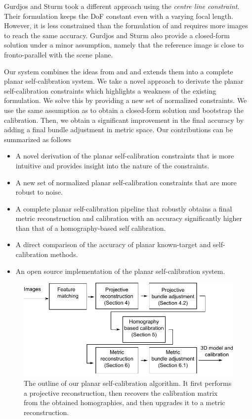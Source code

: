 \documentclass[10pt,twocolumn,letterpaper]{article}
\begin{document}
Gurdjos and Sturm \cite{gurdjos2003} took a different approach using the \emph{centre line constraint}. Their formulation keeps the DoF constant even with a varying focal length. However, it is less constrained than the formulation of \cite{bocquillon2006} and requires more images to reach the same accuracy. Gurdjos and Sturm also provide a closed-form solution under a minor assumption, namely that the reference image is close to fronto-parallel with the scene plane.

Our system combines the ideas from \cite{bocquillon2006} and \cite{gurdjos2003} and extends them into a complete planar self-calibration system. We take a novel approach to derivate the planar self-calibration constraints which highlights a weakness of the existing formulation. We solve this by providing a new set of normalized constraints. We use the same assumption as \cite{gurdjos2003} to obtain a closed-form solution and bootstrap the calibration. Then, we obtain a significant improvement in the final accuracy by adding a final bundle adjustment in metric space. Our contributions can be summarized as follows
\begin{itemize}

\item A novel derivation of the planar self-calibration constraints that is more intuitive and provides insight into the nature of the constraints.

\item A new set of normalized planar self-calibration constraints that are more robust to noise.

\item A complete planar self-calibration pipeline that robustly obtains a final metric reconstruction and calibration with an accuracy significantly higher than that of a homography-based self calibration.

\item A direct comparison of the accuracy of planar known-target and self-calibration methods.

\item An open source implementation of the planar self-calibration system.

\end{itemize}

\begin{figure}
\includegraphics[width=\linewidth]{images/pipeline.pdf}
\caption{The outline of our planar self-calibration algorithm. It first performs a projective reconstruction, then recovers the calibration matrix from the obtained homographies, and then upgrades it to a metric reconstruction.}
\label{fig:diagram}
\end{figure}
\end{document}

